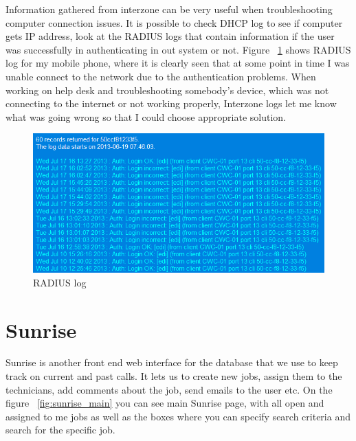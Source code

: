 \documentclass[10pt,a4paper,headinclude=true]{report}
\begin{document}
Information gathered from interzone can be very useful when troubleshooting computer connection issues. It is possible to check DHCP log to see if computer gets IP address, look at the RADIUS logs that contain information if the user was successfully in authenticating in out system or not. Figure ~\ref{fig:interzone_radius} shows RADIUS log for my mobile phone, where it is clearly seen that at some point in time I was unable connect to the network due to the authentication problems. When working on help desk and troubleshooting somebody's device, which was not connecting to the internet or not working properly, Interzone logs let me know what was going wrong so that I could choose appropriate solution.

\begin{figure}[H]
\centering
\centerline{\includegraphics[scale=0.5]{./interzone_radius}}
\caption{RADIUS log}
\label{fig:interzone_radius}
\end{figure}

\section{Sunrise}
Sunrise is another front end web interface for the database that we use to keep track on current and past calls. It lets us to create new jobs, assign them to the technicians, add comments about the job, send emails to the user etc. On the figure ~\ref{fig:sunrise_main} you can see main Sunrise page, with all open and assigned to me jobs as well as the boxes where you can specify search criteria and search for the specific job.
\end{document}
